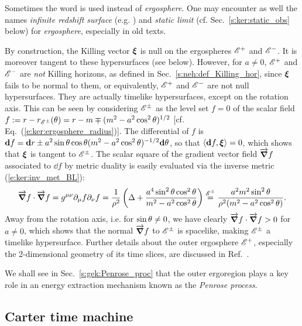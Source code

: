\begin{remark} \label{r:ker:static_limit}
Sometimes the word  is used instead of
\emph{ergosphere}. One may encounter as well the names
\emph{infinite redshift surface} (e.g. \cite{Vishv68}) and
\emph{static limit} (cf. Sec.~\ref{s:ker:static_obs} below)
for \emph{ergosphere}, especially in old texts.
\end{remark}

\begin{remark}
By construction, the Killing vector $\bm{\xi}$ is null on the
ergospheres $\mathscr{E}^+$ and $\mathscr{E}^-$. It is moreover tangent to these
hypersurfaces (see below). However, for $a\neq 0$,
$\mathscr{E}^+$ and $\mathscr{E}^-$ are \emph{not} Killing horizons, as defined
in Sec.~\ref{s:neh:def_Killing_hor}, since
$\bm{\xi}$ fails to be normal to them, or equivalently, $\mathscr{E}^+$ and $\mathscr{E}^-$
are not null hypersurfaces. They are actually timelike hypersurfaces,
except on the rotation axis.
This can be seen by considering $\mathscr{E}^\pm$ as the level
set $f = 0$ of the scalar field
$f := r - r_{\mathscr{E}^\pm}(\theta) = r - m \mp (m^2 - a^2\cos^2\theta)^{1/2}$
[cf. Eq.~(\ref{e:ker:ergosphere_radius})].
The differential of $f$ is $\mathbf{d} f = \mathbf{d} r \pm a^2 \sin\theta \cos\theta
(m^2 - a^2\cos^2\theta)^{-1/2} \mathbf{d}\theta$, so that $\langle\mathbf{d} f, \bm{\xi} \rangle = 0$,
which shows that $\bm{\xi}$ is tangent to $\mathscr{E}^\pm$.
The scalar square of the gradient vector field
$\overrightarrow{\bm{\nabla}} f$ associated to $\dd f$ by metric duality
is easily evaluated via the inverse metric (\ref{e:ker:inv_met_BL}):
\[
    \overrightarrow{\bm{\nabla}} f\cdot \overrightarrow{\bm{\nabla}} f = g^{\mu\nu} \partial_\mu f \partial_\nu f
    = \frac{1}{\rho^2} \left( \Delta + \frac{a^4  \sin^2\theta\cos^2\theta}{m^2 - a^2\cos^2\theta} \right)
    \stackrel{\mathscr{E}^{\pm}}{=} \frac{a^2 m^2 \sin^2\theta}{\rho^2(m^2 - a^2\cos^2\theta)} .
\]
Away from the rotation axis, i.e. for $\sin\theta\neq 0$, we have clearly
$\overrightarrow{\bm{\nabla}} f\cdot \overrightarrow{\bm{\nabla}} f > 0$ for $a\neq 0$, which shows that the normal
$\overrightarrow{\bm{\nabla}} f$ to $\mathscr{E}^{\pm}$ is spacelike, making $\mathscr{E}^{\pm}$ a timelike
hypersurface. Further details about the outer ergosphere $\mathscr{E}^+$, especially
the 2-dimensional geometry of its time slices, are discussed in Ref.~\cite{JacobS09}.
\end{remark}

We shall see in Sec.~\ref{s:gek:Penrose_proc} that the outer ergoregion
plays a key role in an energy extraction mechanism known as the
\emph{Penrose process}.

\subsection{Carter time machine} \label{s:ker:time_machine}

